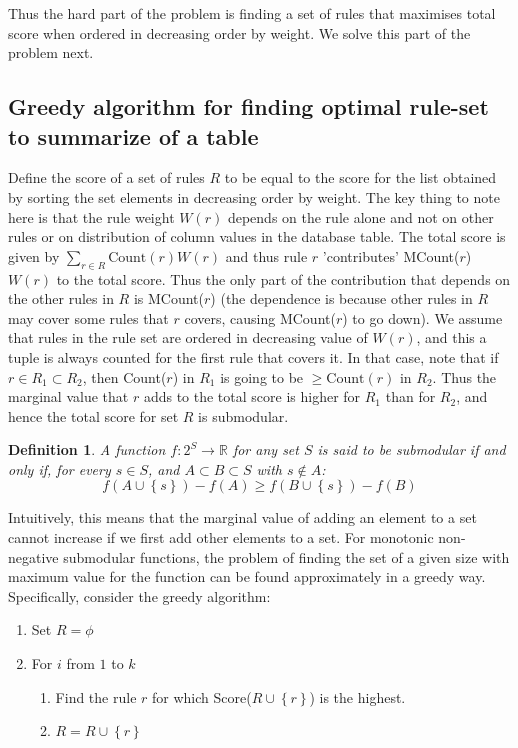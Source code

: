 \documentclass{sig-alternate}
\newtheorem{definition}{Definition}
\begin{document}
Thus the hard part of the problem is finding a set of rules that maximises total score when ordered in decreasing order by weight. We solve this part of the problem next.

\subsection{Greedy algorithm for finding optimal rule-set to summarize of a table}
Define the score of a set of rules $R$ to be equal to the score for the list obtained by sorting the set elements in decreasing order by weight. The key thing to note here is that the rule weight $W(r)$ depends on the rule alone and not on other rules or on distribution of column values in the database table. The total score is given by $\sum_{r \in R} \text{Count}(r)W(r)$ and thus rule $r$ 'contributes' MCount($r$)$W(r)$ to the total score. Thus the only part of the contribution that depends on the other rules in $R$ is MCount($r$) (the dependence is because other rules in $R$ may cover some rules that $r$ covers, causing MCount($r$) to go down). We assume that rules in the rule set are ordered in decreasing value of $W(r)$, and this a tuple is always counted for the first rule that covers it. In that case, note that if $r \in R_1 \subset R_2$, then Count($r$) in $R_1$ is going to be $\geq \text{Count}(r)$ in $R_2$. Thus the marginal value that $r$ adds to the total score is higher for $R_1$ than for $R_2$, and hence the total score for set $R$ is submodular. 

\begin{definition}
A function $f: 2^S \rightarrow \mathbb{R}$ for any set $S$ is said to be submodular if and only if, for every $s \in S$, and $A \subset B \subset S$ with $s \notin A$:
$$f(A \cup \left\lbrace s \right\rbrace) - f(A) \geq f(B \cup \left\lbrace s \right\rbrace) - f(B)$$
\end{definition}

Intuitively, this means that the marginal value of adding an element to a set cannot increase if we first add other elements to a set. For monotonic non-negative submodular functions, the problem of finding the set of a given size with maximum value for the function can be found approximately in a greedy way. Specifically, consider the greedy algorithm:

\begin{framed}
\begin{enumerate}
\item Set $R = \phi$
\item For $i$ from $1$ to $k$
\begin{enumerate}
\item Find the rule $r$ for which Score($R \cup \left\lbrace r \right\rbrace$) is the highest.
\item $R = R \cup \left\lbrace r \right\rbrace$
\end{enumerate}
\end{enumerate}
\end{framed}
\end{document}
